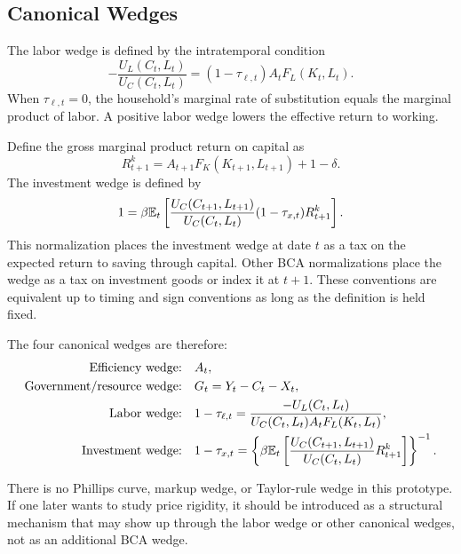 \subsection{Canonical Wedges}

The labor wedge is defined by the intratemporal condition
\begin{equation}
    -\frac{U_L(C_t,L_t)}{U_C(C_t,L_t)}
    =
    (1-\tau_{\ell,t})A_t F_L(K_t,L_t).
    \label{eq:labor_wedge}
\end{equation}
When \(\tau_{\ell,t}=0\), the household's marginal rate of substitution equals
the marginal product of labor. A positive labor wedge lowers the effective
return to working.

Define the gross marginal product return on capital as
\begin{equation}
    R^k_{t+1}
    =
    A_{t+1}F_K(K_{t+1},L_{t+1}) + 1-\delta.
    \label{eq:capital_return}
\end{equation}
The investment wedge is defined by
\begin{equation}
    1
    =
    \beta
    \mathbb{E}_t
    \left[
        \frac{U_C(C_{t+1},L_{t+1})}{U_C(C_t,L_t)}
        (1-\tau_{x,t})
        R^k_{t+1}
    \right].
    \label{eq:investment_wedge}
\end{equation}
This normalization places the investment wedge at date \(t\) as a tax on the
expected return to saving through capital. Other BCA normalizations place the
wedge as a tax on investment goods or index it at \(t+1\). These conventions are
equivalent up to timing and sign conventions as long as the definition is held
fixed.

The four canonical wedges are therefore:
\begin{align}
    \text{Efficiency wedge:} \quad & A_t,
    \label{eq:efficiency_wedge_def}
    \\
    \text{Government/resource wedge:} \quad & G_t = Y_t-C_t-X_t,
    \label{eq:government_wedge_def}
    \\
    \text{Labor wedge:} \quad &
    1-\tau_{\ell,t}
    =
    \frac{-U_L(C_t,L_t)}
    {U_C(C_t,L_t)A_tF_L(K_t,L_t)},
    \label{eq:labor_wedge_def}
    \\
    \text{Investment wedge:} \quad &
    1-\tau_{x,t}
    =
    \left\{
    \beta
    \mathbb{E}_t
    \left[
        \frac{U_C(C_{t+1},L_{t+1})}{U_C(C_t,L_t)}
        R^k_{t+1}
    \right]
    \right\}^{-1}.
    \label{eq:investment_wedge_def}
\end{align}

\begin{remark}
There is no Phillips curve, markup wedge, or Taylor-rule wedge in this
prototype. If one later wants to study price rigidity, it should be introduced
as a structural mechanism that may show up through the labor wedge or other
canonical wedges, not as an additional BCA wedge.
\end{remark}
